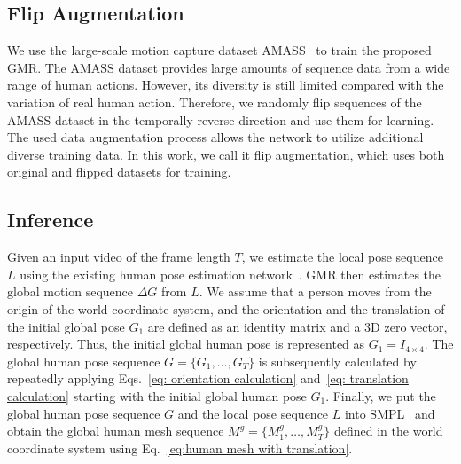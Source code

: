 \documentclass[10pt,twocolumn,letterpaper]{article}
\begin{document}
\subsection{Flip Augmentation}

We use the large-scale motion capture dataset AMASS~\cite{mahmood2019amass} to train the proposed GMR. The AMASS dataset provides large amounts of sequence data from a wide range of human actions. However, its diversity is still limited compared with the variation of real human action. Therefore, we randomly flip sequences of the AMASS dataset in the temporally reverse direction and use them for learning. The used data augmentation process allows the network to utilize additional diverse training data. In this work, we call it flip augmentation, which uses both original and flipped datasets for training.


\subsection{Inference}
\label{subsection: inference}

Given an input video of the frame length $T$, we estimate the local pose sequence $L$ using the existing human pose estimation network~\cite{kocabas2020vibe}. GMR then estimates the global motion sequence $\Delta{G}$ from $L$. We assume that a person moves from the origin of the world coordinate system, and the orientation and the translation of the initial global pose $G_{1}$ are defined as an identity matrix and a 3D zero vector, respectively. Thus, the initial global human pose is represented as $G_{1}=I_{4\times{4}}$.
The global human pose sequence $G=\{G_{1},\ldots,G_{T}\}$ is subsequently calculated by repeatedly applying Eqs.~\ref{eq: orientation calculation} and~\ref{eq: translation calculation} starting with the initial global human pose $G_{1}$. Finally, we put the global human pose sequence $G$ and the local pose sequence $L$ into SMPL~\cite{loper2015smpl} and obtain the global human mesh sequence $M^g=\{M^g_1,\ldots,M^g_T\}$ defined in the world coordinate system using Eq.~\ref{eq:human mesh with translation}.
\end{document}

